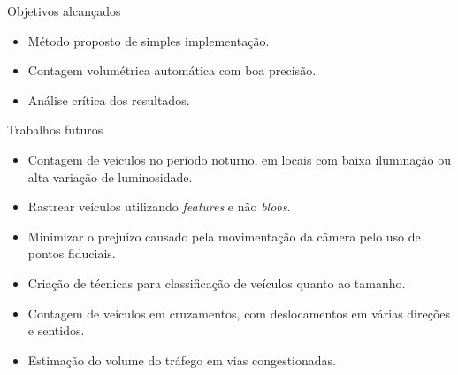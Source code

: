 \begin{frame}{Objetivos alcançados}
  \begin{itemize}
    \item Método proposto de simples implementação.
    \item Contagem volumétrica automática com boa precisão.
    \item Análise crítica dos resultados. 
  \end{itemize}
\end{frame}

\begin{frame}{Trabalhos futuros}
  \begin{itemize}
    \item Contagem de veículos no período noturno, em locais com baixa iluminação ou alta variação de luminosidade.
    \item Rastrear veículos utilizando \textit{features} e não \textit{blobs}.
    \item Minimizar o prejuízo causado pela movimentação da câmera pelo uso de pontos fiduciais.
    \item Criação de técnicas para classificação de veículos quanto ao tamanho.
    \item Contagem de veículos em cruzamentos, com deslocamentos em várias direções e sentidos.
    \item Estimação do volume do tráfego em vias congestionadas.
  \end{itemize}
\end{frame}





  



